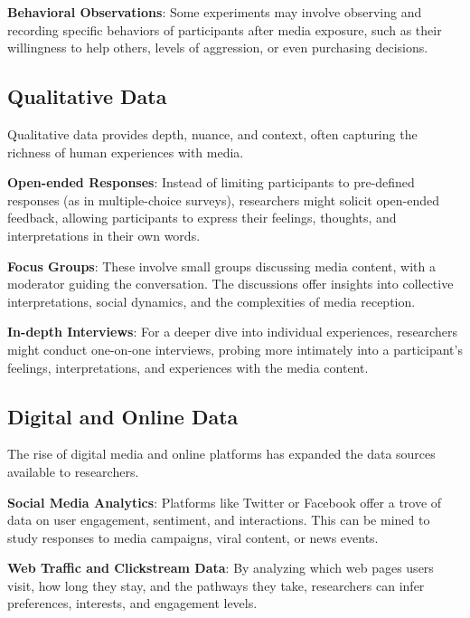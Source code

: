 \documentclass[
  b5paper]{book}
\begin{document}
\textbf{Behavioral Observations}: Some experiments may involve observing and recording specific behaviors of participants after media exposure, such as their willingness to help others, levels of aggression, or even purchasing decisions.

\hypertarget{qualitative-data}{%
\subsection*{Qualitative Data}\label{qualitative-data}}

Qualitative data provides depth, nuance, and context, often capturing the richness of human experiences with media.

\textbf{Open-ended Responses}: Instead of limiting participants to pre-defined responses (as in multiple-choice surveys), researchers might solicit open-ended feedback, allowing participants to express their feelings, thoughts, and interpretations in their own words.

\textbf{Focus Groups}: These involve small groups discussing media content, with a moderator guiding the conversation. The discussions offer insights into collective interpretations, social dynamics, and the complexities of media reception.

\textbf{In-depth Interviews}: For a deeper dive into individual experiences, researchers might conduct one-on-one interviews, probing more intimately into a participant's feelings, interpretations, and experiences with the media content.

\hypertarget{digital-and-online-data}{%
\subsection*{Digital and Online Data}\label{digital-and-online-data}}

The rise of digital media and online platforms has expanded the data sources available to researchers.

\textbf{Social Media Analytics}: Platforms like Twitter or Facebook offer a trove of data on user engagement, sentiment, and interactions. This can be mined to study responses to media campaigns, viral content, or news events.

\textbf{Web Traffic and Clickstream Data}: By analyzing which web pages users visit, how long they stay, and the pathways they take, researchers can infer preferences, interests, and engagement levels.
\end{document}

